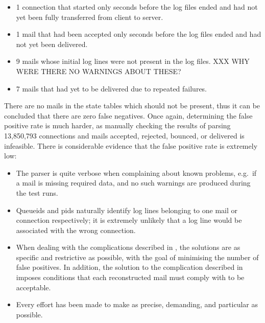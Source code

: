 \begin{itemize}

    \squeezeitems{}

    \item 1 connection that started only seconds before the log files
        ended and had not yet been fully transferred from client to server.

    \item 1 mail that had been accepted only seconds before the log files
        ended and had not yet been delivered.

    \item 9 mails whose initial log lines were not present in the log
        files.  XXX WHY WERE THERE NO WARNINGS ABOUT THESE\@?

    \item 7 mails that had yet to be delivered due to repeated failures.

\end{itemize}

There are no mails in the state tables which should not be present, thus it
can be concluded that there are zero false negatives.  Once again,
determining the false positive rate is much harder, as manually checking
the results of parsing 13,850,793 connections and mails accepted, rejected,
bounced, or delivered is infeasible.  There is considerable evidence that
the false positive rate is extremely low:

\begin{itemize}

    \item The parser is quite verbose when complaining about known
        problems, e.g.\ if a mail is missing required data, and no such
        warnings are produced during the test runs.

    \item Queueids and \glspl{pid} naturally identify log lines belonging
        to one mail or connection respectively; it is extremely unlikely
        that a log line would be associated with the wrong connection.

    \item When dealing with the complications described in
        , the solutions are as specific and
        restrictive as possible, with the goal of minimising the number of
        false positives.  In addition, the solution to the complication
        described in  imposes conditions
        that each reconstructed mail must comply with to be acceptable.

    \item Every effort has been made to make \parsername{} as precise,
        demanding, and particular as possible.

\end{itemize}

